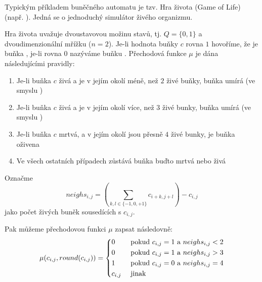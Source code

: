 \documentclass[a4paper,10pt]{article}
\begin{document}
\begin{example} \label{ex:GameOfLife}
  Typickým příkladem buněčného automatu je tzv. Hra života (Game of Life) (např. \cite{TofMar-CelAuMach+}). Jedná se o jednoduchý simulátor živého organizmu. 
  
  Hra života uvažuje dvoustavovou možinu stavů, tj. $Q = \{ 0, 1 \}$ a dvoudimenzionální mřížku ($n = 2$). Je-li hodnota buňky $c$ rovna $1$ hovoříme, že je buňka , je-li rovna $0$ nazýváme buňku . Přechodová funkce $\mu$ je dána následujícími pravidly:
  \begin{enumerate}
   \item Je-li buňka $c$ živá a je v jejím okolí méně, než $2$ živé buňky, buňka umírá (ve smyslu )
   \item Je-li buňka $c$ živá a je v jejím okolí více, než $3$ živé bunky, buňka umírá (ve smyslu )
   \item Je-li buňka $c$ mrtvá, a v jejím okolí jsou přesně $4$ živé bunky, je buňka oživena
   \item Ve všech ostatních případech zůstává buňka buďto mrtvá nebo živá 
  \end{enumerate}
  Označme 
  $$
    neighs_{i,j} = \left( \sum_{k,l \in \{-1, 0, +1\}} c_{i + k, j + l} \right) - c_{i,j}
  $$
  jako počet živých buněk sousedících s $c_{i,j}$. 
  
  Pak můžeme přechodovou funkci $\mu$ zapsat následovně:
  $$
    \mu(c_{i,j}, round(c_{i,j})) = 
      \begin{dcases}
       0 & \text{ pokud $c_{i,j} = 1$ a $neighs_{i,j} < 2$}	\\
       0 & \text{ pokud $c_{i,j} = 1$ a $neighs_{i,j} > 3$}	\\
       1 & \text{ pokud $c_{i,j} = 0$ a $neighs_{i,j} = 4$}	\\
       c_{i,j} & \text{ jinak}
      \end{dcases}
  $$
\end{example}
\end{document}
